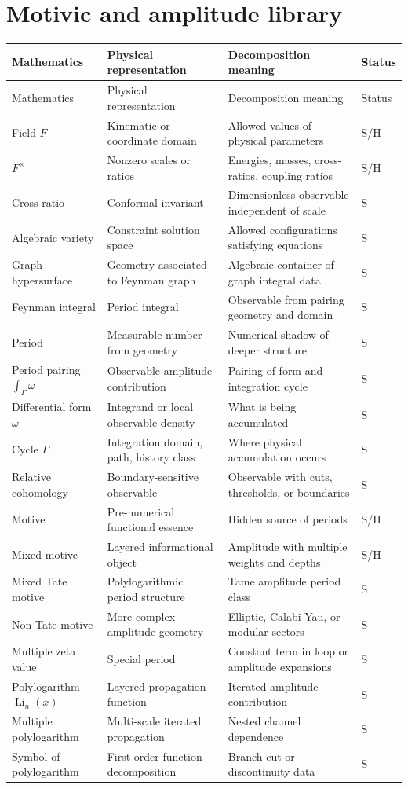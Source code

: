 \documentclass[11pt]{article}
\newcommand{\status}[1]{\textsf{#1}}
\newcommand{\entry}[4]{#1 & #2 & #3 & \status{#4}\\}
\begin{document}
\section{Motivic and amplitude library}
\begin{longtable}{@{}>{\raggedright\arraybackslash}p{}>{\raggedright\arraybackslash}p{}>{\raggedright\arraybackslash}p{}>{\centering\arraybackslash}p{}@{}}
\toprule
Mathematics & Physical representation & Decomposition meaning & Status\\
\midrule
\endfirsthead
\toprule
Mathematics & Physical representation & Decomposition meaning & Status\\
\midrule
\endhead
\bottomrule
\endfoot
\entry{Field $F$}{Kinematic or coordinate domain}{Allowed values of physical parameters}{S/H}
\entry{$F^\times$}{Nonzero scales or ratios}{Energies, masses, cross-ratios, coupling ratios}{S/H}
\entry{Cross-ratio}{Conformal invariant}{Dimensionless observable independent of scale}{S}
\entry{Algebraic variety}{Constraint solution space}{Allowed configurations satisfying equations}{S}
\entry{Graph hypersurface}{Geometry associated to Feynman graph}{Algebraic container of graph integral data}{S}
\entry{Feynman integral}{Period integral}{Observable from pairing geometry and domain}{S}
\entry{Period}{Measurable number from geometry}{Numerical shadow of deeper structure}{S}
\entry{Period pairing $\int_\Gamma\omega$}{Observable amplitude contribution}{Pairing of form and integration cycle}{S}
\entry{Differential form $\omega$}{Integrand or local observable density}{What is being accumulated}{S}
\entry{Cycle $\Gamma$}{Integration domain, path, history class}{Where physical accumulation occurs}{S}
\entry{Relative cohomology}{Boundary-sensitive observable}{Observable with cuts, thresholds, or boundaries}{S}
\entry{Motive}{Pre-numerical functional essence}{Hidden source of periods}{S/H}
\entry{Mixed motive}{Layered informational object}{Amplitude with multiple weights and depths}{S/H}
\entry{Mixed Tate motive}{Polylogarithmic period structure}{Tame amplitude period class}{S}
\entry{Non-Tate motive}{More complex amplitude geometry}{Elliptic, Calabi-Yau, or modular sectors}{S}
\entry{Multiple zeta value}{Special period}{Constant term in loop or amplitude expansions}{S}
\entry{Polylogarithm $\operatorname{Li}_n(x)$}{Layered propagation function}{Iterated amplitude contribution}{S}
\entry{Multiple polylogarithm}{Multi-scale iterated propagation}{Nested channel dependence}{S}
\entry{Symbol of polylogarithm}{First-order function decomposition}{Branch-cut or discontinuity data}{S}

\end{longtable}
\end{document}
